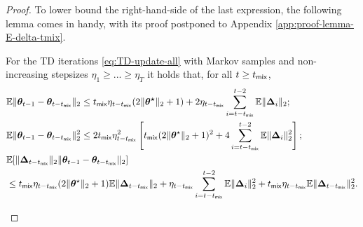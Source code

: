 \begin{proof}
To lower bound the right-hand-side of the last expression, the following lemma comes in handy, with its proof postponed to Appendix \ref{app:proof-lemma-E-delta-tmix}.
\begin{customlemma}\label{lemma:E-delta-tmix}
For the TD iterations \eqref{eq:TD-update-all} with Markov samples and non-increasing stepsizes $\eta_1 \geq ... \geq \eta_T$ it holds that, for all $t \geq t_{\mathsf{mix}}$, %
\begin{subequations}
\begin{align}
&\mathbb{E}\|\bm{\theta}_{t-1} - \bm{\theta}_{t-t_{\mathsf{mix}}}\|_2 \leq t_{\mathsf{mix}}\eta_{t-t_{\mathsf{mix}}}(2\|\bm{\theta^\star}\|_2 + 1)+ 2\eta_{t - t_{\mathsf{mix}}}\sum_{i=t-t_{\mathsf{mix}}}^{t-2}\mathbb{E}\|\bm{\Delta}_i\|_2; \label{eq:E-delta-tmix-1}\\ 
&\mathbb{E}\|\bm{\theta}_{t-1} - \bm{\theta}_{t-t_{\mathsf{mix}}}\|_2^2 \leq 2t_{\mathsf{mix}}\eta_{t-t_{\mathsf{mix}}}^2\left[t_{\mathsf{mix}}(2\|\bm{\theta}^\star\|_2+1)^2 + 4 \sum_{i=t-t_{\mathsf{mix}}}^{t-2} \mathbb{E}\|\bm{\Delta}_i\|_2^2\right]; \label{eq:E-delta-tmix-2}\\ 
&\mathbb{E}[\|\bm{\Delta}_{t-t_{\mathsf{mix}}}\|_2 \|\bm{\theta}_{t-1} - \bm{\theta}_{t-t_{\mathsf{mix}}}\|_2] \nonumber \\ 
&\leq t_{\mathsf{mix}}\eta_{t-t_{\mathsf{mix}}}(2\|\bm{\theta}^\star\|_2 +1)\mathbb{E}\|\bm{\Delta}_{t- t_{\mathsf{mix}}}\|_2+ \eta_{t - t_{\mathsf{mix}}}\sum_{i=t-t_{\mathsf{mix}}}^{t-2}\mathbb{E}\|\bm{\Delta}_{i}\|_2^2 + t_{\mathsf{mix}} \eta_{t - t_{\mathsf{mix}}} \mathbb{E}\|\bm{\Delta}_{t- t_{\mathsf{mix}}}\|_2^2.\label{eq:E-delta-tmix-3}
\end{align}
\end{subequations}
\end{customlemma}


\end{proof}

